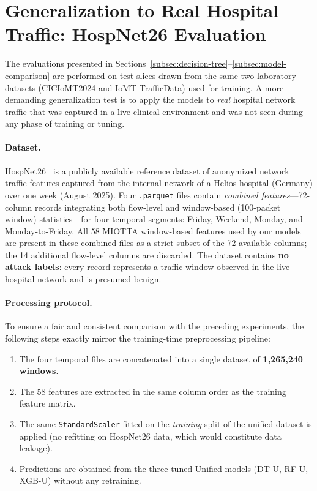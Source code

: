 \section{Generalization to Real Hospital Traffic: HospNet26 Evaluation}
\label{sec:hospnet26}

The evaluations presented in Sections~\ref{subsec:decision-tree}--\ref{subsec:model-comparison} are performed on test slices drawn from the same two laboratory datasets (CICIoMT2024 and IoMT-TrafficData) used for training. A more demanding generalization test is to apply the models to \emph{real} hospital network traffic that was captured in a live clinical environment and was not seen during any phase of training or tuning.

\paragraph{Dataset.}
HospNet26~\cite{hospnet26} is a publicly available reference dataset of anonymized network traffic features captured from the internal network of a Helios hospital (Germany) over one week (August 2025). Four \texttt{.parquet} files contain \emph{combined features}---72-column records integrating both flow-level and window-based (100-packet window) statistics---for four temporal segments: Friday, Weekend, Monday, and Monday-to-Friday. All 58 MIOTTA window-based features used by our models are present in these combined files as a strict subset of the 72 available columns; the 14 additional flow-level columns are discarded. The dataset contains \textbf{no attack labels}: every record represents a traffic window observed in the live hospital network and is presumed benign.

\paragraph{Processing protocol.}
To ensure a fair and consistent comparison with the preceding experiments, the following steps exactly mirror the training-time preprocessing pipeline:
\begin{enumerate}[nosep]
  \item The four temporal files are concatenated into a single dataset of \textbf{1,265,240 windows}.
  \item The 58 features are extracted in the same column order as the training feature matrix.
  \item The same \texttt{StandardScaler} fitted on the \emph{training} split of the unified dataset is applied (no refitting on HospNet26 data, which would constitute data leakage).
  \item Predictions are obtained from the three tuned Unified models (DT-U, RF-U, XGB-U) without any retraining.
\end{enumerate}

